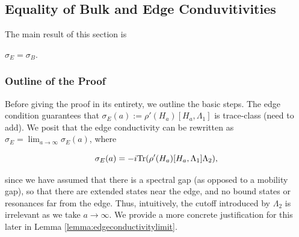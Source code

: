 \documentclass[12pt, letterpaper]{article}
\begin{document}





\subsection{Equality of Bulk and Edge Conduvitivities}




The main result of this section is

\begin{theorem}
$\sigma_E=\sigma_B$.
\label{thm:bulkedge}
\end{theorem}

\subsubsection*{Outline of the Proof}

Before giving the proof in its entirety, we outline the basic steps. The edge condition guarantees that $\sigma_E(a) := \rho'(H_a)[H_a,\Lambda_1]$ is trace-class (need to add). We posit that the edge conductivity can be rewritten as $\sigma_E = \lim_{a\to\infty}\sigma_E(a)$, where

\[\sigma_E(a) = -i\text{Tr}(\rho'(H_a)[H_a,\Lambda_1]\Lambda_2),\]

since we have assumed that there is a spectral gap (as opposed to a mobility gap), so that there are extended states near the edge, and no bound states or resonances far from the edge. Thus, intuitively, the cutoff introduced by $\Lambda_2$ is irrelevant as we take $a\to\infty$. We provide a more concrete justification for this later in Lemma \ref{lemma:edgeconductivitylimit}.
\end{document}
